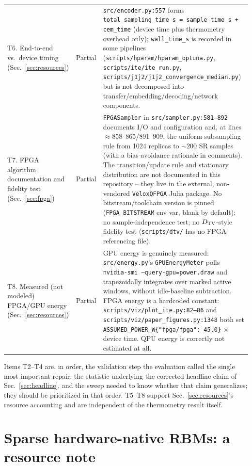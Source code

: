 \begin{table}[t]
\begin{ruledtabular}
\begin{tabular}{lp{}p{}}
T6. End-to-end vs.\ device timing (Sec.~\ref{sec:resources}) & Partial & \texttt{src/encoder.py:557} forms \texttt{total\_sampling\_time\_s = sample\_time\_s + cem\_time} (device time plus thermometry overhead only); \texttt{wall\_time\_s} is recorded in some pipelines (\texttt{scripts/hparam/hparam\_optuna.py}, \texttt{scripts/ite/ite\_run.py}, \texttt{scripts/j1j2/j1j2\_convergence\_median.py}) but is not decomposed into transfer/embedding/decoding/network components. \\
T7. FPGA algorithm documentation and fidelity test (Sec.~\ref{sec:fpga}) & Partial & \texttt{FPGASampler} in \texttt{src/sampler.py:581--892} documents I/O and configuration and, at lines $\approx$858--865/891--909, the uniform-subsampling rule from 1024 replicas to $\sim\!200$ SR samples (with a bias-avoidance rationale in comments). The transition/update rule and stationary distribution are not documented in this repository -- they live in the external, non-vendored \texttt{VeloxQFPGA} Julia package. No bitstream/toolchain version is pinned (\texttt{FPGA\_BITSTREAM} env var, blank by default); no sample-independence test; no $D_{\mathrm{TV}}$-style fidelity test (\texttt{scripts/dtv/} has no FPGA-referencing file). \\
T8. Measured (not modeled) FPGA/GPU energy (Sec.~\ref{sec:resources}) & Partial & GPU energy is genuinely measured: \texttt{src/energy.py}'s \texttt{GPUEnergyMeter} polls \texttt{nvidia-smi --query-gpu=power.draw} and trapezoidally integrates over marked active windows, without idle-baseline subtraction. FPGA energy is a hardcoded constant: \texttt{scripts/viz/plot\_ite.py:82--86} and \texttt{scripts/viz/paper\_figures.py:1348} both set \texttt{ASSUMED\_POWER\_W\{"fpga/fpga": 45.0\}} $\times$ device time. QPU energy is correctly not estimated at all. \\
\end{tabular}
\end{ruledtabular}
\end{table}

Items T2--T4 are, in order, the validation step the evaluation called the single most important repair, the statistic underlying the corrected headline claim of Sec.~\ref{sec:headline}, and the sweep needed to know whether that claim generalizes; they should be prioritized in that order. T5--T8 support Sec.~\ref{sec:resources}'s resource accounting and are independent of the thermometry result itself.

\section{Sparse hardware-native RBMs: a resource note}
\label{app:sparse}

